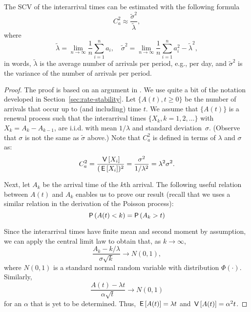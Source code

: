 \begin{theorem} The SCV of the interarrival times can be estimated
  with the following formula
\begin{equation*}
C_a^2 \approx \frac{\tilde \sigma^2}{\tilde \lambda},
\end{equation*}
where 
\begin{equation*}
\tilde  \lambda = \lim_{n\to\infty} \frac 1n  \sum_{i=1}^n a_i,\quad  
\tilde  \sigma^2 = \lim_{n\to\infty} \frac 1 n \sum_{i=1}^n a_i^2 - \tilde \lambda^2,
\end{equation*}
in words, $\tilde \lambda$ is the average number of arrivals per
period, e.g., per day, and $\tilde \sigma^2 $ is the variance of the
number of arrivals per period.
\end{theorem}

\begin{proof}
  The proof is based on an argument in \cite{cox62:_renew_theor}. We
  use quite a bit of the notation developed in
  Section~\ref{sec:rate-stability}. Let $\{A(t), t\geq 0\}$ be the
  number of arrivals that occur up to (and including) time $t$. We
  assume that $\{A(t)\}$ is a renewal process such that the
  interarrival times $\{X_k, k=1, 2, \ldots\}$ with
  $X_k = A_{k}-A_{k-1}$, are i.i.d. with mean $1/\lambda$ and standard
  deviation~$\sigma$. (Observe that $\sigma$ is not the same as
  $\tilde \sigma$ above.) Note that $C_a^2$ is defined in terms of
  $\lambda$ and $\sigma$ as:
\begin{equation*}
C_a^2 = \frac{\,\mathsf{V}\left[X_i\right]}{(\,\mathsf{E}\left[X_i\right])^2} = \frac{\sigma^2}{1/\lambda^2} = \lambda^2 \sigma^2.
\end{equation*}

Next, let $A_k$ be the arrival time of the $k$th arrival. The
following useful relation between $A(t)$ and $A_k$ enables us to prove
our result (recall that we uses a similar relation in the derivation
of the Poisson process):
\begin{equation*}
\P{A(t) < k} = \P{A_k > t}
\end{equation*}

Since the interarrival times have finite mean and second moment by
assumption, we can apply the central limit law to obtain that, as
$k\to\infty$,
\begin{equation*}
\frac{A_k -k/\lambda}{\sigma \sqrt k} \to N(0,1),
\end{equation*}
where $N(0,1)$ is a standard normal random variable with
distribution $\Phi(\cdot)$.  Similarly,
%
\begin{equation*}
\frac{A(t) -\lambda t}{\alpha \sqrt t} \to N(0,1)
\end{equation*}
for an $\alpha$ that is yet to be determined. Thus,
$\,\mathsf{E}\left[A(t)\right] = \lambda t$ and $\,\mathsf{V}\left[A(t)\right]=\alpha^2 t$.


\end{proof}
